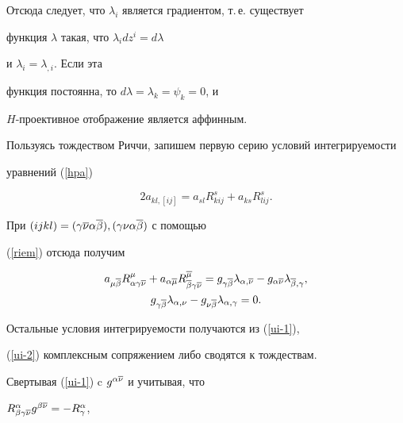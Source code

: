 Отсюда следует, что $\lambda_i$ является градиентом, т.\,е. существует


функция $\lambda$ такая, что $\lambda_i dz^i=d\lambda$


и $\lambda_i = \lambda_{,i}$. Если эта


функция постоянна, то $d\lambda = \lambda_k=\psi_k=0$, и


$H$-проективное отображение является аффинным.





Пользуясь тождеством Риччи, запишем первую серию условий интегрируемости


уравнений (\ref{hpa})


\begin{equation}


\label{ui-ij}


2a_{kl,[ij]} =a_{sl}R^s_{kij} + a_{ks} R^s_{lij}.


\end{equation}


При $(ijkl)=


(\gamma\ol\nu\alpha\ol\beta),(\gamma\nu\alpha\ol\beta)$ с помощью


(\ref{riem}) отсюда получим


\begin{gather}


\label{ui-1}


a_{\mu\ol\beta} R^{\mu}_{\alpha\gamma\ol\nu}+


a_{\alpha\ol\mu}R^{\ol\mu}_{\ol\beta\gamma\ol\nu}=


g_{\gamma\ol\beta}\lambda_{\alpha,\ol\nu}-


g_{\alpha\ol\nu}\lambda_{\ol\beta,\gamma},\\


\label{ui-2}


g_{\gamma\ol\beta}\lambda_{\alpha,\nu}-


g_{\nu\ol\beta}\lambda_{\alpha,\gamma}=0.


\end{gather}


Остальные условия интегрируемости получаются из (\ref{ui-1}),


(\ref{ui-2}) комплексным сопряжением либо сводятся к тождествам.


Свертывая (\ref{ui-1}) c $g^{\alpha\overline\nu}$ и учитывая, что


$R^{\alpha}_{\beta\gamma\overline\nu}g^{\beta\overline\nu} = -R^{\alpha}_{\gamma}$,


